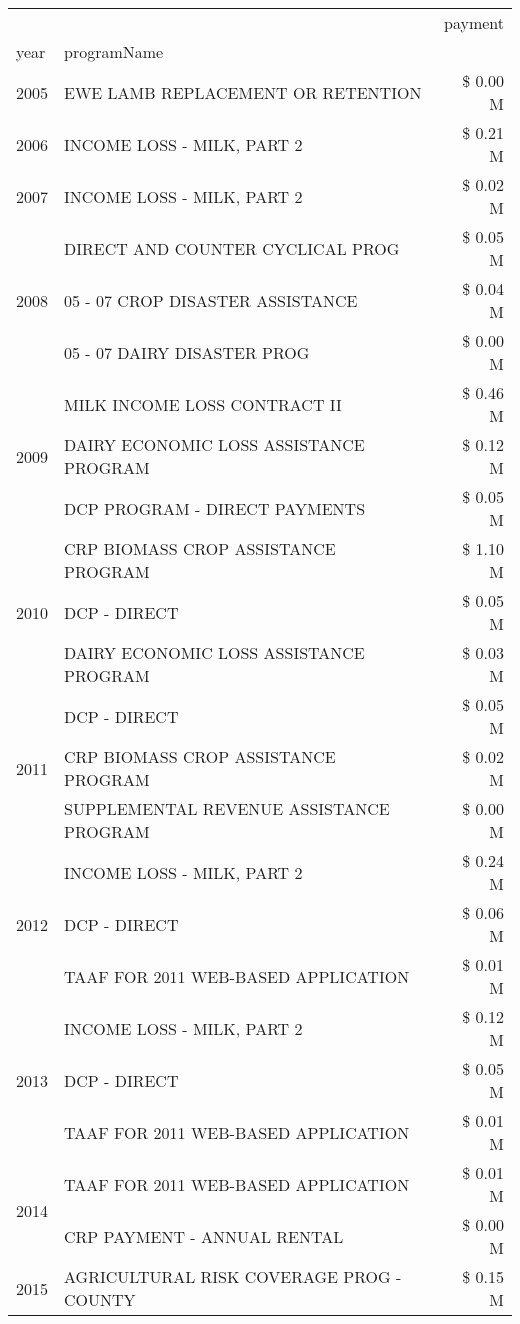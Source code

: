 \begin{tabular}{llr}
\toprule
 &  & payment \\
year & programName &  \\
\midrule
2005 & EWE LAMB REPLACEMENT OR RETENTION & \$ 0.00 M \\
\cline{1-3}
2006 & INCOME LOSS - MILK, PART 2 & \$ 0.21 M \\
\cline{1-3}
2007 & INCOME LOSS - MILK, PART 2 & \$ 0.02 M \\
\cline{1-3}
\multirow[t]{3}{*}{2008} & DIRECT AND COUNTER CYCLICAL PROG & \$ 0.05 M \\
 & 05 - 07 CROP DISASTER ASSISTANCE & \$ 0.04 M \\
 & 05 - 07 DAIRY DISASTER PROG & \$ 0.00 M \\
\cline{1-3}
\multirow[t]{3}{*}{2009} & MILK INCOME LOSS CONTRACT II & \$ 0.46 M \\
 & DAIRY ECONOMIC LOSS ASSISTANCE PROGRAM & \$ 0.12 M \\
 & DCP PROGRAM - DIRECT PAYMENTS & \$ 0.05 M \\
\cline{1-3}
\multirow[t]{3}{*}{2010} & CRP BIOMASS CROP ASSISTANCE PROGRAM & \$ 1.10 M \\
 & DCP - DIRECT & \$ 0.05 M \\
 & DAIRY ECONOMIC LOSS ASSISTANCE PROGRAM & \$ 0.03 M \\
\cline{1-3}
\multirow[t]{3}{*}{2011} & DCP - DIRECT & \$ 0.05 M \\
 & CRP BIOMASS CROP ASSISTANCE PROGRAM & \$ 0.02 M \\
 & SUPPLEMENTAL REVENUE ASSISTANCE PROGRAM & \$ 0.00 M \\
\cline{1-3}
\multirow[t]{3}{*}{2012} & INCOME LOSS - MILK, PART 2 & \$ 0.24 M \\
 & DCP - DIRECT & \$ 0.06 M \\
 & TAAF FOR 2011 WEB-BASED APPLICATION & \$ 0.01 M \\
\cline{1-3}
\multirow[t]{3}{*}{2013} & INCOME LOSS - MILK, PART 2 & \$ 0.12 M \\
 & DCP - DIRECT & \$ 0.05 M \\
 & TAAF FOR 2011 WEB-BASED APPLICATION & \$ 0.01 M \\
\cline{1-3}
\multirow[t]{2}{*}{2014} & TAAF FOR 2011 WEB-BASED APPLICATION & \$ 0.01 M \\
 & CRP PAYMENT - ANNUAL RENTAL & \$ 0.00 M \\
\cline{1-3}
\multirow[t]{2}{*}{2015} & AGRICULTURAL RISK COVERAGE PROG - COUNTY & \$ 0.15 M \\

\end{tabular}
